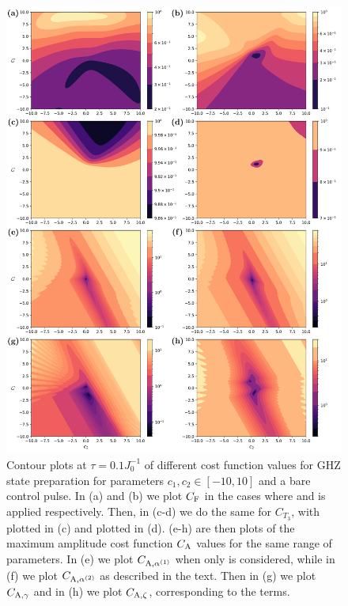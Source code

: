 \begin{figure}[t!]
    \centering
    \includegraphics[width=0.8\linewidth]{images/final_plot_max_nogrape.png} \caption[Contour plots of cost function landscapes for GHZ state preparation in frustrated spin systems (maximum amplitude cost function) using a bare optimisation pulse.]{Contour plots at $\tau = 0.1 J_0^{-1}$ of different cost function values for GHZ state preparation for parameters $c_1, c_2 \in [-10,10]$ and a bare control pulse. In (a) and (b) we plot $C_{\rm F}$ in the cases where  and   is applied respectively. Then, in (c-d) we do the same for $C_{T_3}$, with   plotted in (c) and   plotted in (d). (e-h) are then plots of the maximum amplitude cost function $C_{\rm A}$ values for the same range of parameters. In (e) we plot $C_{\rm A, \alpha^{(1)}}$ when only   is considered, while in (f) we plot $C_{\rm A, \alpha^{(2)}}$ as described in the text. Then in (g) we plot $C_{\rm A, \gamma}$ and in (h) we plot $C_{\rm A, \zeta}$, corresponding to the  terms.}\label{fig:ghz_contours_max_noGRAPE}
\end{figure}

